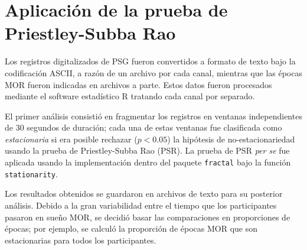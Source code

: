 %


\section{Aplicación de la prueba de Priestley-Subba Rao}

Los registros digitalizados de PSG fueron convertidos a formato de texto bajo la codificación 
ASCII, a razón de un archivo por cada canal, mientras que las épocas MOR fueron indicadas en 
archivos a parte.
%
Estos datos fueron procesados mediante el software estadístico R \cite{R_citar} tratando cada
canal por separado.

El primer análisis consistió en fragmentar los registros en ventanas independientes de 30 segundos
de duración; cada una de estas ventanas fue clasificada como \textit{estacionaria} si
era posible rechazar ($p<0.05$) la hipótesis de no-estacionariedad usando la prueba de
Priestley-Subba Rao (PSR). 
La prueba de PSR \textit{per se} fue aplicada usando la implementación dentro del paquete 
\texttt{fractal} \cite{R_fractal} bajo la función \texttt{stationarity}.

Los resultados obtenidos se guardaron en archivos de texto para su posterior análisis. Debido
a la gran variabilidad entre el tiempo que los participantes pasaron en sueño MOR, se decidió
basar las comparaciones en proporciones de épocas; por ejemplo, se calculó la proporción de
épocas MOR que son estacionarias para todos los participantes.

